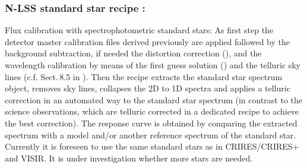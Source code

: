 \clearpage

\subsubsection{N-LSS standard star recipe :}\label{rec:metis_n_lss_std}
Flux calibration with spectrophotometric standard stars: As first step the detector master calibration files derived previously are applied followed by the background subtraction, if needed the distortion correction (), and
the wavelength calibration by means of the first guess solution () and the telluric sky lines (c.f. Sect.\,8.5 in \cite{DRLS}). Then the recipe extracts the standard star spectrum object, removes sky lines, collapses the 2D to 1D spectra and applies a telluric correction in an automated way to the standard star spectrum (in contrast to the science observations, which are telluric corrected in a dedicated recipe to achieve the best correction). The response curve is obtained by comparing the extracted spectrum with a model and/or another reference spectrum of the standard star. Currently it is foreseen to use the same standard stars as in \ac{CRIRES}/CRIRES+ and \ac{VISIR}. It is under investigation whether more stars are needed.
